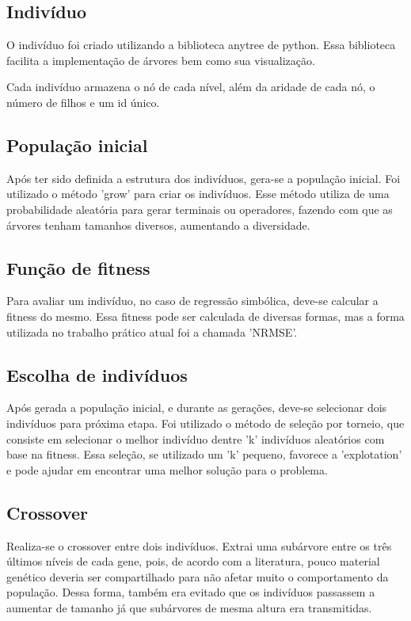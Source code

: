 \documentclass[]{article}
\begin{document}
\subsection{Indivíduo}
O indivíduo foi criado utilizando a biblioteca anytree de python. Essa biblioteca facilita a implementação de árvores bem como sua visualização.

Cada indivíduo armazena o nó de cada nível, além da aridade de cada nó, o número de filhos e um id único.

\subsection{População inicial}
Após ter sido definida a estrutura dos indivíduos, gera-se a população inicial. Foi utilizado o método 'grow' para criar os indivíduos. Esse método utiliza de uma probabilidade aleatória para gerar terminais ou operadores, fazendo com que as árvores tenham tamanhos diversos, aumentando a diversidade.


\subsection{Função de fitness}
Para avaliar um indivíduo, no caso de regressão simbólica, deve-se calcular a fitness do mesmo. Essa fitness pode ser calculada de diversas formas, mas a forma utilizada no trabalho prático atual foi a chamada 'NRMSE'. 


\subsection{Escolha de indivíduos}
Após gerada a população inicial, e durante as gerações, deve-se selecionar dois indivíduos para próxima etapa. Foi utilizado o método de seleção por torneio, que consiste em selecionar o melhor indivíduo dentre 'k' indivíduos aleatórios com base na fitness. Essa seleção, se utilizado um 'k' pequeno, favorece a 'explotation' e pode ajudar em encontrar uma melhor solução para o problema.

\subsection{Crossover}
Realiza-se o crossover entre dois indivíduos. Extrai uma subárvore entre os três últimos níveis de cada gene, pois, de acordo com a literatura, pouco material genético deveria ser compartilhado para não afetar muito o comportamento da população. Dessa forma, também era evitado que os indivíduos passassem a aumentar de tamanho já que subárvores de mesma altura era transmitidas. 
\end{document}
